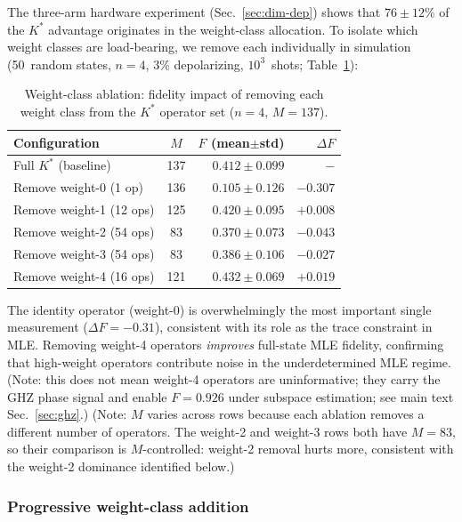 \documentclass[twocolumn,prx,aps,superscriptaddress,longbibliography,floatfix]{revtex4-2}
\begin{document}
The three-arm hardware experiment (Sec.~\ref{sec:dim-dep}) shows
that $76 \pm 12$\% of the $K^*$ advantage originates in the
weight-class allocation.  To isolate which weight classes are
load-bearing, we remove each individually in simulation
(50~random states, $n = 4$, 3\% depolarizing, $10^3$~shots;
Table~\ref{tab:ablation}):

\begin{table}[ht!]
\caption{Weight-class ablation: fidelity impact of removing each
weight class from the $K^*$ operator set ($n = 4$, $M = 137$).}
\label{tab:ablation}
\begin{ruledtabular}
\begin{tabular}{lcrr}
Configuration & $M$ & $F$ (mean$\pm$std) & $\Delta F$ \\
\hline
Full $K^*$ (baseline) & 137 & $0.412 \pm 0.099$ & $-$ \\
Remove weight-0 (1 op) & 136 & $0.105 \pm 0.126$ & $-0.307$ \\
Remove weight-1 (12 ops) & 125 & $0.420 \pm 0.095$ & $+0.008$ \\
Remove weight-2 (54 ops) & 83 & $0.370 \pm 0.073$ & $-0.043$ \\
Remove weight-3 (54 ops) & 83 & $0.386 \pm 0.106$ & $-0.027$ \\
Remove weight-4 (16 ops) & 121 & $0.432 \pm 0.069$ & $+0.019$ \\
\end{tabular}
\end{ruledtabular}
\end{table}

The identity operator (weight-0) is overwhelmingly the most
important single measurement ($\Delta F = -0.31$), consistent with
its role as the trace constraint in MLE\@.  Removing weight-4
operators \emph{improves} full-state MLE fidelity, confirming that
high-weight operators contribute noise in the underdetermined MLE
regime.  (Note: this does not mean weight-4 operators are
uninformative; they carry the GHZ phase signal and enable
$F = 0.926$ under subspace estimation; see main text Sec.~\ref{sec:ghz}.)  (Note: $M$ varies across rows because each ablation removes
a different number of operators.  The weight-2 and weight-3 rows
both have $M = 83$, so their comparison is $M$-controlled:
weight-2 removal hurts more, consistent with the weight-2 dominance
identified below.)

\subsubsection{Progressive weight-class addition}
\end{document}
